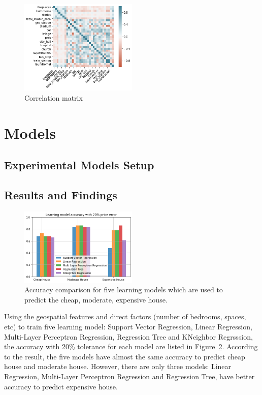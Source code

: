 \documentclass[11pt,a4paper]{article}
\begin{document}
\begin{figure}[h]
\centering
\includegraphics[width=0.5\textwidth]{result-data/correlation_matrix}
\caption{Correlation matrix}
\label{fig:corr}
\end{figure}


\section{Models}

\subsection{Experimental Models Setup}

\subsection{Results and Findings}

\begin{figure}[h]
\includegraphics[width=0.5\textwidth]{result-data/tolerance20.png}
\caption{Accuracy comparison for five learning models which are used to predict the cheap, moderate, expensive house.}
\label{fig:tolerance20}
\centering
\end{figure}
Using the geospatial features and direct factors (number of bedrooms, spaces, etc) to train five learning model: Support Vector Regression, Linear Regression, Multi-Layer Perceptron Regression, Regression Tree and KNeighbor Regrsssion, the accuracy with 20\% tolerance for each model are listed in Figure~\ref{fig:tolerance20}. According to the result, the five models have almost the same accuracy to predict cheap house and moderate house. However, there are only three models: Linear Regression, Multi-Layer Perceptron Regression and Regression Tree, have better accuracy to predict expensive house. 
\end{document}
